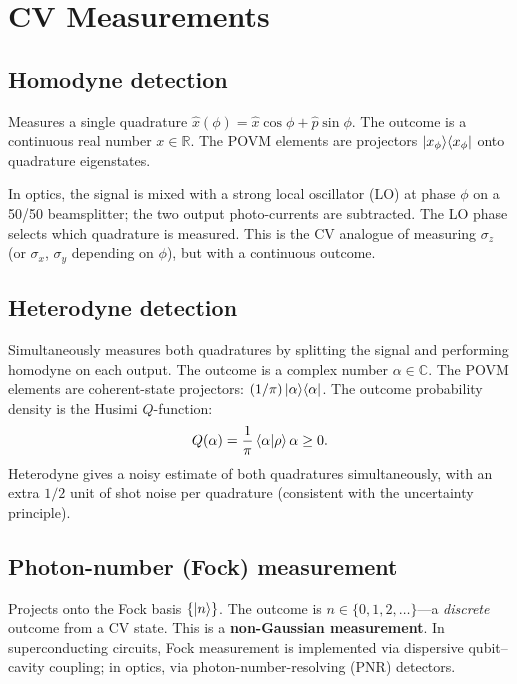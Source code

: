 \documentclass[11pt]{article}
\newcommand{\CR}{\mathbb{R}}
\newcommand{\CC}{\mathbb{C}}
\newcommand{\xh}{\hat{x}}
\newcommand{\ph}{\hat{p}}
\begin{document}
\section{CV Measurements}
\label{sec:measurements}

\subsection{Homodyne detection}

Measures a single quadrature
$\xh(\phi) = \xh\cos\phi + \ph\sin\phi$.
The outcome is a continuous real number $x \in \CR$.
The POVM elements are projectors
$\ket{x_\phi}\!\bra{x_\phi}$ onto quadrature eigenstates.

In optics, the signal is mixed with a strong local oscillator (LO) at
phase $\phi$ on a 50/50 beamsplitter; the two output photo-currents are
subtracted.  The LO phase selects which quadrature is measured.
This is the CV analogue of measuring $\sigma_z$
(or $\sigma_x$, $\sigma_y$ depending on $\phi$), but with a continuous
outcome.

\subsection{Heterodyne detection}

Simultaneously measures both quadratures by splitting the signal and
performing homodyne on each output.  The outcome is a complex number
$\alpha \in \CC$.  The POVM elements are coherent-state projectors:
$(1/\pi)\ket{\alpha}\!\bra{\alpha}$.
The outcome probability density is the Husimi $Q$-function:
\begin{equation}
Q(\alpha) = \frac{1}{\pi}\braket{\alpha}{\rho}{\alpha} \geq 0.
\end{equation}
Heterodyne gives a noisy estimate of both quadratures simultaneously,
with an extra $1/2$ unit of shot noise per quadrature (consistent with
the uncertainty principle).

\subsection{Photon-number (Fock) measurement}

Projects onto the Fock basis $\{\ket{n}\}$.
The outcome is $n \in \{0, 1, 2, \ldots\}$---a \emph{discrete} outcome
from a CV state.  This is a \textbf{non-Gaussian measurement}.
In superconducting circuits, Fock measurement is implemented via
dispersive qubit--cavity coupling; in optics, via photon-number-resolving
(PNR) detectors.
\end{document}
